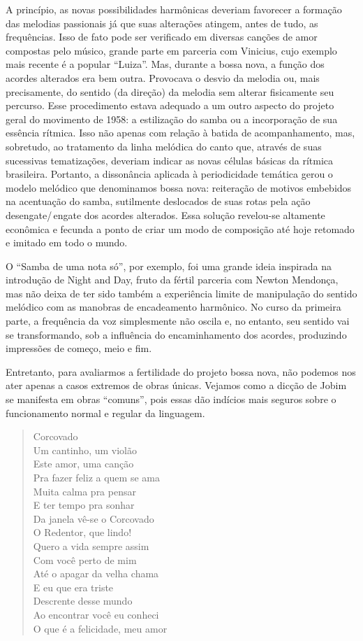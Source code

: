A princípio, as novas possibilidades harmônicas deveriam favorecer a
formação das melodias passionais já que suas alterações atingem, antes
de tudo, as frequências. Isso de fato pode ser verificado em diversas
canções de amor compostas pelo músico, grande parte em parceria com
Vinicius, cujo exemplo mais recente é a popular ``Luiza''. Mas, durante a bossa nova, a função dos acordes alterados era
bem outra. Provocava o desvio da melodia ou, mais precisamente, do
sentido (da direção) da melodia sem alterar fisicamente seu percurso.
Esse procedimento estava adequado a um outro aspecto do projeto geral do
movimento de 1958: a estilização do samba ou a incorporação de sua
essência rítmica. Isso não apenas com relação à batida de
acompanhamento, mas, sobretudo, ao tratamento da linha melódica do canto
que, através de suas sucessivas tematizações, deveriam indicar as novas
células básicas da rítmica brasileira. Portanto, a dissonância aplicada
à periodicidade temática gerou o modelo melódico que denominamos bossa
nova: reiteração de motivos embebidos na acentuação do samba, sutilmente
deslocados de suas rotas pela ação desengate/\,engate dos acordes
alterados. Essa solução revelou-se altamente econômica e fecunda a ponto
de criar um modo de composição até hoje retomado e imitado em todo o
mundo.

O ``Samba de uma nota só'', por exemplo, foi uma grande ideia inspirada na
introdução de Night and Day, fruto da fértil parceria com Newton
Mendonça, mas não deixa de ter sido também a experiência limite de
manipulação do sentido melódico com as manobras de encadeamento
harmônico. No curso da primeira parte, a frequência da voz simplesmente
não oscila e, no entanto, seu sentido vai se transformando, sob a
influência do encaminhamento dos acordes, produzindo impressões de
começo, meio e fim.

Entretanto, para avaliarmos a fertilidade do projeto bossa nova, não
podemos nos ater apenas a casos extremos de obras únicas. Vejamos como a
dicção de Jobim se manifesta em obras ``comuns'', pois essas dão
indícios mais seguros sobre o funcionamento normal e regular da
linguagem.

\begin{verse}
Corcovado\\
Um cantinho, um violão\\
Este amor, uma canção\\
Pra fazer feliz a quem se ama\\
Muita calma pra pensar\\
E ter tempo pra sonhar\\
Da janela vê-se o Corcovado\\
O Redentor, que lindo!\\
Quero a vida sempre assim\\
Com você perto de mim\\
Até o apagar da velha chama\\
E eu que era triste\\
Descrente desse mundo\\
Ao encontrar você eu conheci\\
O que é a felicidade, meu amor
\end{verse}

